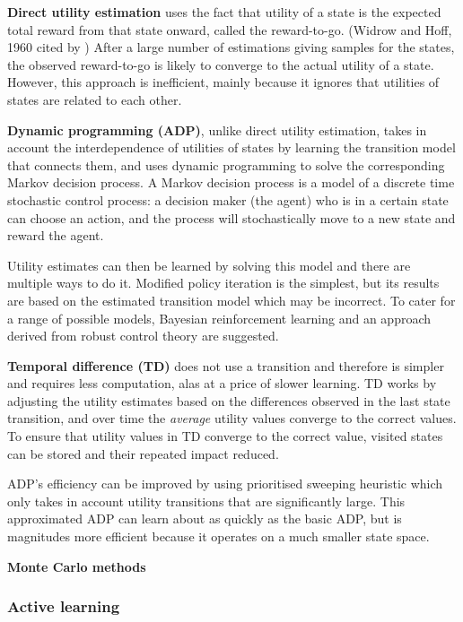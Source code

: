 \textbf{Direct utility estimation} uses the fact that utility of a state is the
expected total reward from that state onward, called the reward-to-go. (Widrow
and Hoff, 1960 cited by \textcite{Russell2010ai+modern}) After a large number
of estimations giving samples for the states, the observed reward-to-go is
likely to converge to the actual utility of a state. However, this approach is
inefficient, mainly because it ignores that utilities of states are related to
each other. \parencite{Russell2010ai+modern}

\textbf{Dynamic programming (ADP)}, unlike direct utility estimation,
takes in account the interdependence of utilities of states by learning the
transition model that connects them, and uses dynamic programming to solve the
corresponding Markov decision process. A Markov decision process is a model of
a discrete time stochastic control process: a decision maker (the agent) who is
in a certain state can choose an action, and the process will stochastically
move to a new state and reward the agent. \parencite{Russell2010ai+modern}

Utility estimates can then be learned by solving this model and there are
multiple ways to do it. Modified policy iteration is the simplest, but its
results are based on the estimated transition model which may be incorrect. To 
cater for a range of possible models, Bayesian reinforcement learning and an
approach derived from robust control theory are suggested.
\parencite{Russell2010ai+modern}

\textbf{Temporal difference (TD)} does not use a transition and therefore is
simpler and requires less computation, alas at a price of slower learning. TD
works by adjusting the utility estimates based on the differences observed in
the last state transition, and over time the \textit{average} utility values
converge to the correct values. To ensure that utility values in TD converge to
the correct value, visited states can be stored and their repeated impact
reduced. \parencite{Russell2010ai+modern}

ADP's efficiency can be improved by using prioritised sweeping heuristic which
only takes in account utility transitions that are significantly large. This
approximated ADP can learn about as quickly as the basic ADP, but is magnitudes
more efficient because it operates on a much smaller state space.
\parencite{Russell2010ai+modern}

\textbf{Monte Carlo methods} 

\subsubsection{Active learning}

